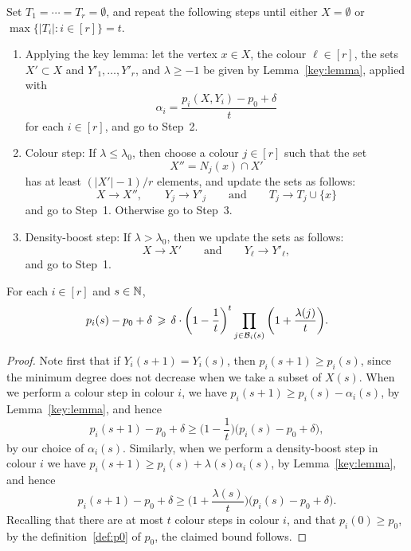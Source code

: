 \begin{algorithm}\label{alg:book}
  Set $T_1 = \cdots = T_r = \emptyset$, and repeat the following steps until either $X = \emptyset$ or $\max\big\{ |T_i| : i \in [r] \big\} = t$. 
  \begin{enumerate}
  \item\label{Alg:Step1} Applying the key lemma: let the vertex $x \in X$, the colour $\ell \in [r]$, the sets $X' \subset X$ and $Y'_1,\ldots,Y'_r$, and $\lambda \ge -1$ be given by Lemma~\ref{key:lemma}, applied with
  \begin{equation}\label{def:alpha}
  \alpha_i = \frac{p_i(X,Y_i) - p_0 + \delta}{t}
  \end{equation}
  for each $i \in [r]$, and go to Step~2.\smallskip
  \item\label{Alg:Step2} Colour step: If $\lambda \le \lambda_0$, then choose a colour $j \in [r]$ such that the set
  $$X'' = N_j(x) \cap X'$$ 
  has at least $(|X'| - 1)/r$ elements, and update the sets as follows:
  $$X \to X'', \qquad Y_j \to Y'_j \qquad \text{and} \qquad T_j \to T_j \cup \{x\}$$
  and go to Step~1. Otherwise go to Step~3.\smallskip
  \item\label{Alg:Step3} Density-boost step: If $\lambda > \lambda_0$, then we update the sets as follows:
  $$X \to X' \qquad \text{and} \qquad Y_\ell \to Y'_\ell,$$
  and go to Step~1.
  \end{enumerate}  
\end{algorithm} 

\begin{lemma}\label{lem:pi:lower:bound}
  For each $i \in [r]$ and $s \in \mathbb{N}$, 
  \begin{equation}\label{eq:pi:lower:bound}
    p_i(s) - p_0 + \delta \, \geqslant \, \delta \cdot \bigg( 1 - \frac{1}{t} \bigg)^{t} \prod_{j \in \mathcal{B}_i(s)} \bigg( 1 + \frac{\lambda(j)}{t} \bigg).
  \end{equation}
\end{lemma}
  
\begin{proof}
  Note first that if $Y_i(s+1) = Y_i(s)$, then $p_i(s+1) \ge p_i(s)$, since the minimum degree does not decrease when we take a subset of $X(s)$. When we perform a colour step in colour $i$, %
  we have $p_i(s+1) \ge p_i(s) - \alpha_i(s)$, by Lemma~\ref{key:lemma}, and hence
  $$p_i(s+1) - p_0 + \delta \ge \bigg( 1 - \frac{1}{t} \bigg) \big( p_i(s) - p_0 + \delta \big),$$
  by our choice of $\alpha_i(s)$. Similarly, when we perform a density-boost step in colour $i$  
  we have $p_i(s+1) \ge p_i(s) + \lambda(s) \alpha_i(s)$, by Lemma~\ref{key:lemma}, and hence
  $$p_i(s+1) - p_0 + \delta \ge \bigg( 1 + \frac{\lambda(s)}{t} \bigg) \big( p_i(s) - p_0 + \delta \big).$$
  Recalling that there are at most $t$ colour steps in colour $i$, and that $p_i(0) \ge p_0$, by the definition~\eqref{def:p0} of $p_0$, the claimed bound follows. 
\end{proof}


